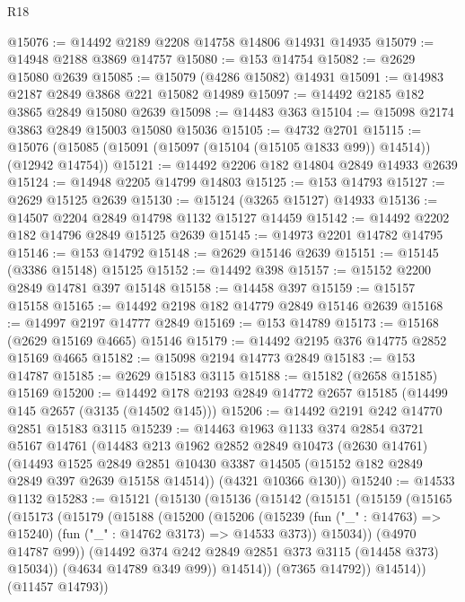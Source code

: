 \begin{lexlean}{R18}
\begin{coremodule}
@15076 := @14492 @2189 @2208 @14758 @14806 @14931 @14935
@15079 := @14948 @2188 @3869 @14757
@15080 := @153 @14754
@15082 := @2629 @15080 @2639
@15085 := @15079 (@4286 @15082) @14931
@15091 := @14983 @2187 @2849 @3868 @221 @15082 @14989
@15097 := @14492 @2185 @182 @3865 @2849 @15080 @2639
@15098 := @14483 @363
@15104 := @15098 @2174 @3863 @2849 @15003 @15080 @15036
@15105 := @4732 @2701
@15115 := @15076 (@15085 (@15091 (@15097 (@15104 (@15105 @1833 @99)) @14514)) (@12942 @14754))
@15121 := @14492 @2206 @182 @14804 @2849 @14933 @2639
@15124 := @14948 @2205 @14799 @14803
@15125 := @153 @14793
@15127 := @2629 @15125 @2639
@15130 := @15124 (@3265 @15127) @14933
@15136 := @14507 @2204 @2849 @14798 @1132 @15127 @14459
@15142 := @14492 @2202 @182 @14796 @2849 @15125 @2639
@15145 := @14973 @2201 @14782 @14795
@15146 := @153 @14792
@15148 := @2629 @15146 @2639
@15151 := @15145 (@3386 @15148) @15125
@15152 := @14492 @398
@15157 := @15152 @2200 @2849 @14781 @397 @15148
@15158 := @14458 @397
@15159 := @15157 @15158
@15165 := @14492 @2198 @182 @14779 @2849 @15146 @2639
@15168 := @14997 @2197 @14777 @2849
@15169 := @153 @14789
@15173 := @15168 (@2629 @15169 @4665) @15146
@15179 := @14492 @2195 @376 @14775 @2852 @15169 @4665
@15182 := @15098 @2194 @14773 @2849
@15183 := @153 @14787
@15185 := @2629 @15183 @3115
@15188 := @15182 (@2658 @15185) @15169
@15200 := @14492 @178 @2193 @2849 @14772 @2657 @15185 (@14499 @145 @2657 (@3135 (@14502 @145)))
@15206 := @14492 @2191 @242 @14770 @2851 @15183 @3115
@15239 := @14463
    @1963
    @1133
    @374
    @2854
    @3721
    @5167
    @14761
    (@14483
      @213
      @1962
      @2852
      @2849
      @10473
      (@2630 @14761)
      (@14493
        @1525
        @2849
        @2851
        @10430
        @3387
        @14505
        (@15152 @182 @2849 @2849 @397 @2639 @15158 @14514))
      (@4321 @10366 @130))
@15240 := @14533 @1132
@15283 := @15121
    (@15130
      (@15136
        (@15142
          (@15151
            (@15159
              (@15165
                (@15173
                  (@15179
                    (@15188
                      (@15200
                        (@15206
                          (@15239
                            (fun ("_" : @14763) => @15240)
                            (fun ("_" : @14762 @3173) => @14533 @373))
                          @15034))
                      (@4970 @14787 @99))
                    (@14492 @374 @242 @2849 @2851 @373 @3115 (@14458 @373) @15034))
                  (@4634 @14789 @349 @99))
                @14514))
            (@7365 @14792))
          @14514))
      (@11457 @14793))

\end{coremodule}
\end{lexlean}
